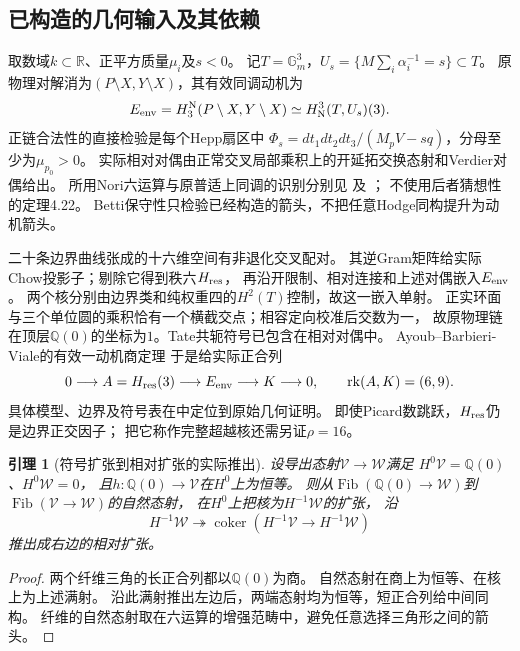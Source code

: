 \documentclass[11pt,a4paper]{ctexart}
\theoremstyle{cnplain}\newtheorem{theorem}{定理}[section]
\newtheorem{lemma}[theorem]{引理}
\theoremstyle{definition}\newtheorem{definition}[theorem]{定义}
\theoremstyle{remark}\newtheorem{remark}[theorem]{注}
\begin{document}
\subsection{已构造的几何输入及其依赖}
取数域$k\subset\mathbb R$、正平方质量$\mu_i$及$s<0$。
记$T=\mathbb G_m^3$，$U_s=\{M\sum_i\alpha_i^{-1}=s\}\subset T$。
原物理对解消为$(P\setminus X,Y\setminus X)$，其有效同调动机为
\[
 E_{\rm env}=H_3^{\rm N}(P\setminus X,Y\setminus X)
 \simeq H^3_{\rm N}(T,U_s)(3).
\]
正链合法性的直接检验是每个Hepp扇区中
$\Phi_s=dt_1dt_2dt_3/(M_pV-sq)$，分母至少为$\mu_{p_0}>0$。
实际相对对偶由正常交叉局部乘积上的开延拓交换态射和Verdier对偶给出。
所用Nori六运算与原普适上同调的识别分别见
\cite[Proposition 2.11]{BridgeIM}及
\cite[Theorem 4.5, Corollaries 4.8,4.20]{BridgeTubach}；
不使用后者猜想性的定理4.22。
Betti保守性只检验已经构造的箭头，不把任意Hodge同构提升为动机箭头。

二十条边界曲线张成的十六维空间有非退化交叉配对。
其逆Gram矩阵给实际Chow投影子；剔除它得到秩六$H_{\rm res}$，
再沿开限制、相对连接和上述对偶嵌入$E_{\rm env}$。
两个核分别由边界类和纯权重四的$H^2(T)$控制，故这一嵌入单射。
正实环面与三个单位圆的乘积恰有一个横截交点；相容定向校准后交数为一，
故原物理链在顶层$\mathbb Q(0)$的坐标为$1$。Tate共轭符号已包含在相对对偶中。
Ayoub--Barbieri-Viale的有效一动机商定理
\cite[Theorem 8.12]{BridgeABV}于是给实际正合列
\[
 0\longrightarrow A=H_{\rm res}(3)\longrightarrow E_{\rm env}
 \longrightarrow K\longrightarrow0,\qquad \operatorname{rk}(A,K)=(6,9).
\]
具体模型、边界及符号表在\cite{BridgeAudit}中定位到原始几何证明。
即使Picard数跳跃，$H_{\rm res}$仍是边界正交因子；
把它称作完整超越核还需另证$\rho=16$。

\begin{lemma}[符号扩张到相对扩张的实际推出]\label{lem:bridgefiber}
设导出态射$\mathcal V\to\mathcal W$满足
$H^0\mathcal V=\mathbb Q(0)$、$H^0\mathcal W=0$，
且$h:\mathbb Q(0)\to\mathcal V$在$H^0$上为恒等。
则从$\operatorname{Fib}(\mathbb Q(0)\to\mathcal W)$到
$\operatorname{Fib}(\mathcal V\to\mathcal W)$的自然态射，
在$H^0$上把核为$H^{-1}\mathcal W$的扩张，
沿
\[
 H^{-1}\mathcal W\twoheadrightarrow
 \operatorname{coker}(H^{-1}\mathcal V\to H^{-1}\mathcal W)
\]
推出成右边的相对扩张。
\end{lemma}
\begin{proof}
两个纤维三角的长正合列都以$\mathbb Q(0)$为商。
自然态射在商上为恒等、在核上为上述满射。
沿此满射推出左边后，两端态射均为恒等，短正合列给中间同构。
纤维的自然态射取在六运算的增强范畴中，避免任意选择三角形之间的箭头。
\end{proof}
\end{document}

